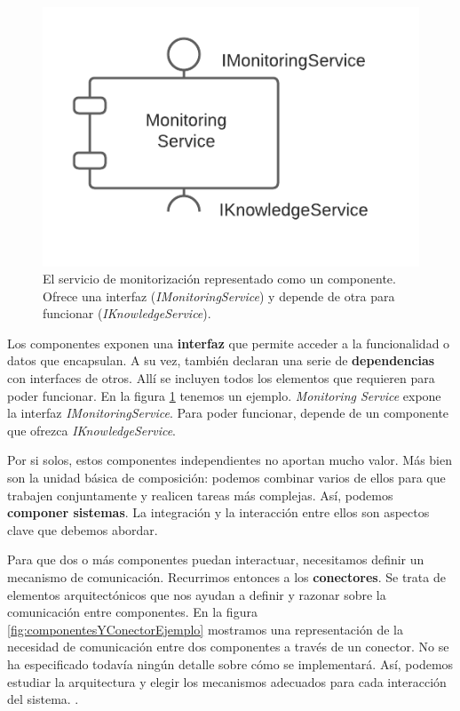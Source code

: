 \begin{figure}
  \centering
  \includegraphics[scale=0.8]{03_arquitectura/images/componente-ejemplo}
  \caption{El servicio de monitorización representado como un componente. Ofrece una interfaz (\emph{IMonitoringService}) y depende de otra para funcionar (\emph{IKnowledgeService}).}
  \label{fig:componenteEjemplo}
\end{figure}

Los componentes exponen una \textbf{interfaz} que permite acceder a la funcionalidad o datos que encapsulan. A su vez, también declaran una serie de \textbf{dependencias} con interfaces de otros. Allí se incluyen todos los elementos que requieren para poder funcionar. En la figura \ref{fig:componenteEjemplo} tenemos un ejemplo. \emph{Monitoring Service} expone la interfaz \emph{IMonitoringService}. Para poder funcionar, depende de un componente que ofrezca \emph{IKnowledgeService}.

Por si solos, estos componentes independientes no aportan mucho valor. Más bien son la unidad básica de composición: podemos combinar varios de ellos para que trabajen conjuntamente y realicen tareas más complejas. Así, podemos \textbf{componer sistemas}. \cite{mehtaTaxonomySoftwareConnectors2000} La integración y la interacción entre ellos son aspectos clave que debemos abordar.

Para que dos o más componentes puedan interactuar, necesitamos definir un mecanismo de comunicación. Recurrimos entonces a los \textbf{conectores}. Se trata de elementos arquitectónicos que nos ayudan a definir y razonar sobre la comunicación entre componentes. En la figura \ref{fig:componentesYConectorEjemplo} mostramos una representación de la necesidad de comunicación entre dos componentes a través de un conector. No se ha especificado todavía ningún detalle sobre cómo se implementará. Así, podemos estudiar la arquitectura y elegir los mecanismos adecuados para cada interacción del sistema. \cite{taylorSoftwareArchitectureFoundations2009}.

